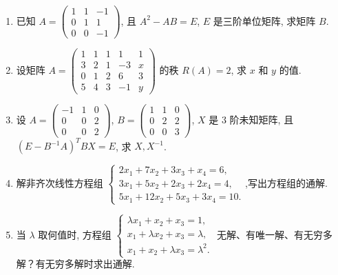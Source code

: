 \begin{enumerate}
	
	\item 已知 $A =
	\begin{pmatrix}
		1 & 1 & -1 \\
		0 & 1 & 1 \\
		0 & 0 & -1
	\end{pmatrix}$, 且 $A^2 - AB = E$, $E$ 是三阶单位矩阵, 求矩阵 $B$.
	
	
	\item 设矩阵 $A =
	\begin{pmatrix}
		1 & 1 & 1 & 1 & 1 \\
		3 & 2 & 1 & -3 & x \\
		0 & 1 & 2 & 6 & 3 \\
		5 & 4 & 3 & -1 & y
	\end{pmatrix}$
	的秩 $R(A)=2$, 求 $x$ 和 $y$ 的值.
	
	
	
	\item 设 $A =
	\begin{pmatrix}
		-1 & 1 & 0 \\
		0 & 0 & 2 \\
		0 & 0 & 2
	\end{pmatrix}$, $B =
	\begin{pmatrix}
		1 & 1 & 0 \\
		0 & 2 & 2 \\
		0 & 0 & 3
	\end{pmatrix}$, $X$ 是 $3$ 阶未知矩阵, 且
	$(E - B^{-1}A)^T B X = E$, 求 $X, X^{-1}$.
	
	
	\item 解非齐次线性方程组
	$
	\begin{cases}
		2x_1 + 7x_2 + 3x_3 + x_4 = 6, \\
		3x_1 + 5x_2 + 2x_3 + 2x_4 = 4, \\
		5x_1 + 12x_2 + 5x_3 + 3x_4 = 10.
	\end{cases}
	$,写出方程组的通解.
	
	
	\item 当 $\lambda$ 取何值时, 方程组
	$
	\begin{cases}
		\lambda x_1 + x_2 + x_3 = 1, \\
		x_1 + \lambda x_2 + x_3 = \lambda, \\
		x_1 + x_2 + \lambda x_3 = \lambda^2.
	\end{cases}
	$
	无解、有唯一解、有无穷多解？有无穷多解时求出通解.
	

\end{enumerate}
